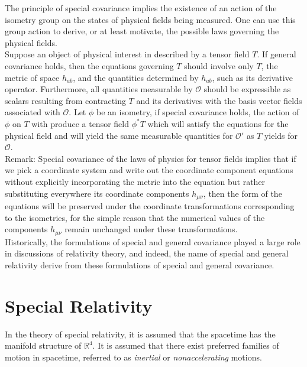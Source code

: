\documentclass[11pt, onesided]{book}
\theoremstyle{break}
\theoremstyle{break}
\newcommand{\R}{\mathbb{R}}
\newcommand{\remark}{\color{blue}Remark: \color{black}}
\begin{document}
The principle of special covariance implies the existence of an action of the isometry group on the states of physical fields being measured. One can use this group action to derive, or at least motivate, the possible laws governing the physical fields. \\

Suppose an object of physical interest in described by a tensor field $T$. If general covariance holds, then the equations governing $T$ should involve only $T$, the metric of space $h_{ab}$, and the quantities determined by $h_{ab}$, such as its derivative operator. Furthermore, all quantities measurable by $\mathcal{O}$ should be expressible as scalars resulting from contracting $T$ and its derivatives with the basis vector fields associated with $\mathcal{O}$. Let $\phi$ be an isometry, if special covariance holds, the action of $\phi$ on $T$ with produce a tensor field $\phi^*T$ which will satisfy the equations for the physical field and will yield the same measurable quantities for $\mathcal{O}'$ as $T$ yields for $\mathcal{O}$. \\

\remark Special covariance of the laws of physics for tensor fields implies that if we pick a coordinate system and write out the coordinate component equations without explicitly incorporating the metric into the equation but rather substituting everywhere its coordinate components $h_{\mu\nu}$, then the form of the equations will be preserved under the coordinate transformations corresponding to the isometries, for the simple reason that the numerical values of the components $h_{\mu\nu}$ remain unchanged under these transformations.\\

Historically, the formulations of special and general covariance played a large role in discussions of relativity theory, and indeed, the name of special and general relativity derive from these formulations of special and general covariance. 



\newpage
\section[Special Relativity]{\color{red}Special Relativity\color{black}}
In the theory of special relativity, it is assumed that the spacetime has the manifold structure of $\R^4$. It is assumed that there exist preferred families of motion in spacetime, referred to as \textit{inertial} or \textit{nonaccelerating} motions. \\
\end{document}
